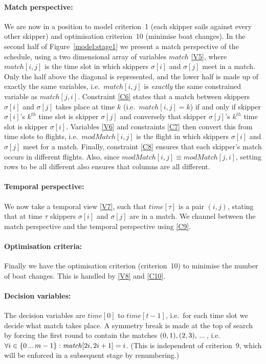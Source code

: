 \documentclass{llncs}
\newcommand{\match}{\mathit{match}}
\newcommand{\modMatch}{\mathit{modMatch}}
\newcommand{\timeVar}{\mathit{time}}
\newcommand\nldots{\,\hbox to 0.8em{.\hss.\hss.}\,}
\begin{document}
\paragraph{Match perspective:} We are now in a position to model criterion~1 (each skipper sails
against every other skipper) and optimisation criterion~10 (minimise boat changes).  In the second
half of Figure~\ref{model:stage1} we present a match perspective of the schedule, using a two
dimensional array of variables $\match$ \eqref{V5}, where $\match[{i,j}]$ is the time slot in which
skippers $\sigma[{i}]$ and $\sigma[{j}]$ meet in a match. Only the half above the diagonal is
represented, and the lower half is made up of exactly the same variables, i.e.\ $\match[{i,j}]$ is
\emph{exactly} the same constrained variable as $\match[{j,i}]$. Constraint \eqref{C6} states that
a match between skippers $\sigma[{i}]$ and $\sigma[{j}]$ takes place at time $k$ (i.e.\
$\match[{i,j}] = k$) if and only if  skipper $\sigma[{i}]$'s $k^{th}$ time slot is skipper
$\sigma[{j}]$ and conversely that skipper $\sigma[{j}]$'s $k^{th}$ time slot is skipper
$\sigma[{i}]$. Variables \eqref{V6} and constraints \eqref{C7} then convert this from time slots to
flights, i.e.\ $\modMatch[{i,j}]$ is the flight in which skippers $\sigma[{i}]$ and $\sigma[{j}]$
meet for a match. Finally, constraint \eqref{C8} ensures that each skipper's match occurs in
different flights. Also, since $\modMatch[{i,j}] \equiv \modMatch[{j,i}]$, setting rows to be all
different also ensures that columns are all different.

\paragraph{Temporal perspective:} We now take a temporal view \eqref{V7}, such that
$\timeVar[{\tau}]$ is a pair $(i,j)$, stating that at time $\tau$ skippers $\sigma[{i}]$ and
$\sigma[{j}]$ are in a match. We channel between the match perspective and the temporal perspective
using \eqref{C9}.

\paragraph{Optimisation criteria:} Finally we have the optimisation criterion (criterion~10) to
minimise the number of boat changes. This is handled by \eqref{V8} and \eqref{C10}.

\paragraph{Decision variables:} The decision variables are $\timeVar[{0}]$ to $\timeVar[{t-1}]$,
i.e.\ for each time slot we decide what match takes place. A symmetry break is made at the top of
search by forcing the first round to contain the matches $(0,1), (2,3), \nldots$, i.e.\ $\forall i
\in \{0 \nldots {m-1}\} : \match[{2i, 2i+1}] = i$. (This is independent of criterion~9, which will
be enforced in a subsequent stage by renumbering.)
\end{document}
